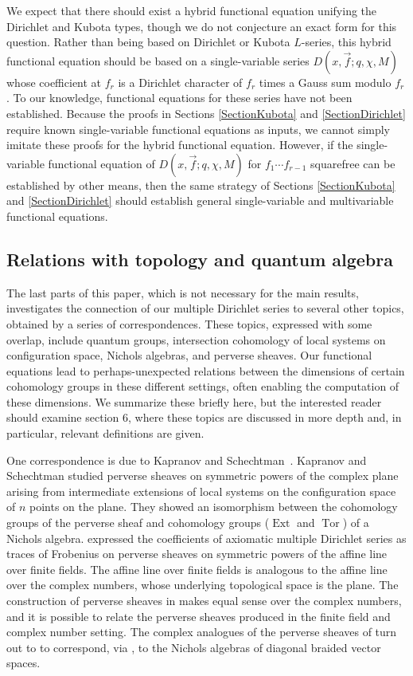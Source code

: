 \documentclass[11pt,letterpaper]{article}
\theoremstyle{definition}
\theoremstyle{remark}
\numberwithin{equation}{section}
\theoremstyle{dotless}
\begin{document}
We expect that there should exist a hybrid functional equation unifying the Dirichlet and Kubota types, though we do not conjecture an exact form for this question. Rather than being based on Dirichlet or Kubota $L$-series, this hybrid functional equation should be based on a single-variable series $D(x, \vec{f}; q, \chi, M)$ whose coefficient at $f_r$ is a Dirichlet character of $f_r$ times a Gauss sum modulo $f_r$. To our knowledge, functional equations for these series have not been established. Because the proofs in Sections \ref{SectionKubota} and \ref{SectionDirichlet} require known single-variable functional equations as inputs, we cannot simply imitate these proofs for the hybrid functional equation. However, if the single-variable functional equation of $D(x, \vec{f}; q, \chi, M)$ for $f_1\cdots f_{r-1}$ squarefree can be established by other means, then the same strategy of Sections \ref{SectionKubota} and \ref{SectionDirichlet} should establish general single-variable and multivariable functional equations. 


\subsection{Relations with topology and quantum algebra}

The last parts of this paper, which is not necessary for the main results, investigates the connection of our multiple Dirichlet series to several other topics, obtained by a series of correspondences. These topics, expressed with some overlap, include quantum groups, intersection cohomology of local systems on configuration space, Nichols algebras, and perverse sheaves. Our functional equations lead to perhaps-unexpected relations between the dimensions of certain cohomology groups in these different settings, often enabling the computation of these dimensions. We summarize these briefly here, but the interested reader should examine section 6, where these topics are discussed in more depth and, in particular, relevant definitions are given.

One correspondence is due to Kapranov and Schechtman~\cite{KapranovSchechtman}. Kapranov and Schechtman studied perverse sheaves on symmetric powers of the complex plane arising from intermediate extensions of local systems on the configuration space of $n$ points on the plane. They showed an isomorphism between the cohomology groups of the perverse sheaf and cohomology groups ($\operatorname{Ext}$ and $\operatorname{Tor}$) of a Nichols algebra. \cite{s-amds} expressed the coefficients of axiomatic multiple Dirichlet series as traces of Frobenius on perverse sheaves on symmetric powers of the affine line over finite fields. The affine line over finite fields is analogous to the affine line over the complex numbers, whose underlying topological space is the plane. The construction of perverse sheaves in \cite{s-amds} makes equal sense over the complex numbers, and it is possible to relate the perverse sheaves produced in the finite field and complex number setting. The complex analogues of the perverse sheaves of \cite{s-amds} turn out to to correspond, via \cite{KapranovSchechtman}, to the Nichols algebras of diagonal braided vector spaces.
\end{document}
